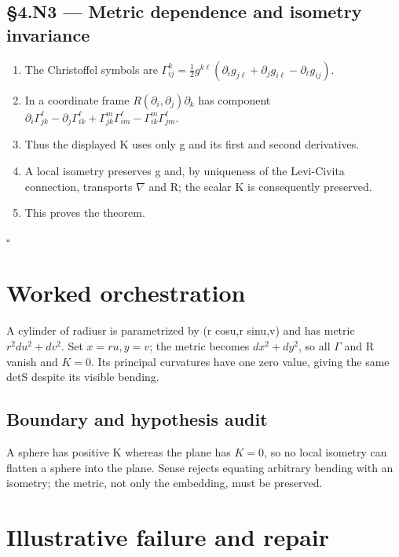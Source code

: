 \documentclass[preprint,12pt,aps,pra,showkeys,amsmath,amssymb,superscriptaddress,floatfix]{revtex4-2}
\theoremstyle{definition}
\theoremstyle{remark}
\begin{document}
\subsection{§4.N3 --- Metric dependence and isometry
invariance}\label{n3-metric-dependence-and-isometry-invariance}

\begin{enumerate}
\def\labelenumi{\arabic{enumi}.}
\item
  The Christoffel symbols are
  \(\Gamma^k_{ij}=\tfrac12 g^{k\ell}(\partial_i g_{j\ell}+\partial_j g_{i\ell}-\partial_\ell g_{ij})\).
\item
  In a coordinate frame \(R(\partial _i,\partial _j)\partial _k\) has
  component
  \(\partial_i\Gamma^\ell_{jk}-\partial_j\Gamma^\ell_{ik}+\Gamma^m_{jk}\Gamma^\ell_{im}-\Gamma^m_{ik}\Gamma^\ell_{jm}\).
\item
  Thus the displayed K uses only g and its first and second derivatives.
\item
  A local isometry preserves g and, by uniqueness of the Levi-Civita
  connection, transports \(\nabla\) and R; the scalar K is consequently
  preserved.
\item
  This proves the theorem.
\end{enumerate}

\hfill$\square$

\section{Worked orchestration}

A cylinder of radiusr is parametrized by (r cosu,r sinu,v) and has
metric \(r^{2}du^{2}+dv^{2}\). Set \(x=ru,y=v\); the metric becomes
\(dx^{2}+dy^{2}\), so all \(\Gamma\) and R vanish and \(K=0\). Its
principal curvatures have one zero value, giving the same detS despite
its visible bending.

\subsection{Boundary and hypothesis audit}

A sphere has positive K whereas the plane has \(K=0\), so no local
isometry can flatten a sphere into the plane. Sense rejects equating
arbitrary bending with an isometry; the metric, not only the embedding,
must be preserved.

\section{Illustrative failure and repair}
\end{document}

